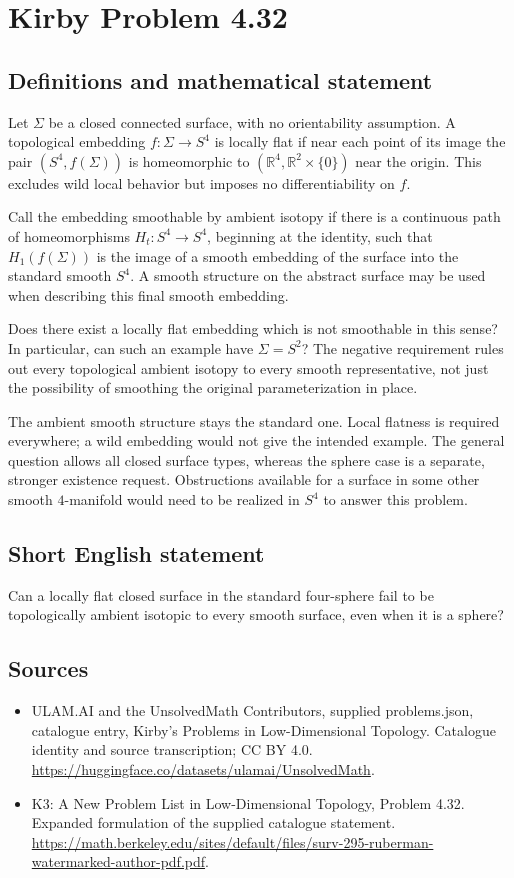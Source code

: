 \documentclass[11pt,a4paper]{article}
\begin{document}
\section*{Kirby Problem 4.32}\label{statement}

\subsection{Definitions and mathematical statement}
Let $\Sigma$ be a closed connected surface, with no orientability
assumption. A topological embedding $f:\Sigma\to S^4$ is locally
flat if near each point of its image the pair $(S^4,f(\Sigma))$ is
homeomorphic to $(\mathbb R^4,\mathbb R^2\times\{0\})$ near the
origin. This excludes wild local behavior but imposes no differentiability
on $f$.

Call the embedding smoothable by ambient isotopy if there is a
continuous path of homeomorphisms $H_t:S^4\to S^4$, beginning at
the identity, such that $H_1(f(\Sigma))$ is the image of a smooth
embedding of the surface into the standard smooth $S^4$.
A smooth structure on the abstract surface may be used when describing
this final smooth embedding.

Does there exist a locally flat embedding which is not smoothable
in this sense? In particular, can such an example have $\Sigma=S^2$?
The negative requirement rules out every topological ambient isotopy
to every smooth representative, not just the possibility of smoothing
the original parameterization in place.

The ambient smooth structure stays the standard one. Local flatness
is required everywhere; a wild embedding would not give the intended
example. The general question allows all closed surface types, whereas
the sphere case is a separate, stronger existence request. Obstructions
available for a surface in some other smooth $4$-manifold would need
to be realized in $S^4$ to answer this problem.
\subsection{Short English statement}
Can a locally flat closed surface in the standard four-sphere fail to be topologically ambient isotopic to every smooth surface, even when it is a sphere?
\subsection{Sources}
\begin{itemize}
\item[S1] ULAM.AI and the UnsolvedMath Contributors, supplied problems.json, catalogue entry, Kirby's Problems in Low-Dimensional Topology. Catalogue identity and source transcription; CC BY 4.0.
\url{https://huggingface.co/datasets/ulamai/UnsolvedMath}.
\item[S2] K3: A New Problem List in Low-Dimensional Topology, Problem 4.32. Expanded formulation of the supplied catalogue statement.
\url{https://math.berkeley.edu/sites/default/files/surv-295-ruberman-watermarked-author-pdf.pdf}.
\end{itemize}
\end{document}
